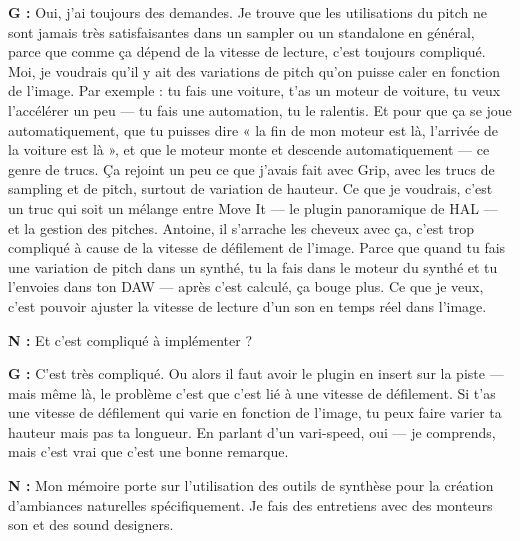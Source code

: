 ﻿\documentclass[12pt]{article}
\begin{document}
\textbf{G :} Oui, j'ai toujours des demandes. Je trouve que les utilisations du pitch ne sont jamais très satisfaisantes dans un sampler ou un standalone en général, parce que comme ça dépend de la vitesse de lecture, c'est toujours compliqué. Moi, je voudrais qu'il y ait des variations de pitch qu'on puisse caler en fonction de l'image. Par exemple : tu fais une voiture, t'as un moteur de voiture, tu veux l'accélérer un peu — tu fais une automation, tu le ralentis. Et pour que ça se joue automatiquement, que tu puisses dire « la fin de mon moteur est là, l'arrivée de la voiture est là », et que le moteur monte et descende automatiquement — ce genre de trucs. Ça rejoint un peu ce que j'avais fait avec Grip, avec les trucs de sampling et de pitch, surtout de variation de hauteur. Ce que je voudrais, c'est un truc qui soit un mélange entre Move It — le plugin panoramique de HAL — et la gestion des pitches. Antoine, il s'arrache les cheveux avec ça, c'est trop compliqué à cause de la vitesse de défilement de l'image. Parce que quand tu fais une variation de pitch dans un synthé, tu la fais dans le moteur du synthé et tu l'envoies dans ton DAW — après c'est calculé, ça bouge plus. Ce que je veux, c'est pouvoir ajuster la vitesse de lecture d'un son en temps réel dans l'image.

\textbf{N :} Et c'est compliqué à implémenter ?

\textbf{G :} C'est très compliqué. Ou alors il faut avoir le plugin en insert sur la piste — mais même là, le problème c'est que c'est lié à une vitesse de défilement. Si t'as une vitesse de défilement qui varie en fonction de l'image, tu peux faire varier ta hauteur mais pas ta longueur. En parlant d'un vari-speed, oui — je comprends, mais c'est vrai que c'est une bonne remarque.

\textbf{N :} Mon mémoire porte sur l'utilisation des outils de synthèse pour la création d'ambiances naturelles spécifiquement. Je fais des entretiens avec des monteurs son et des sound designers.
\end{document}
